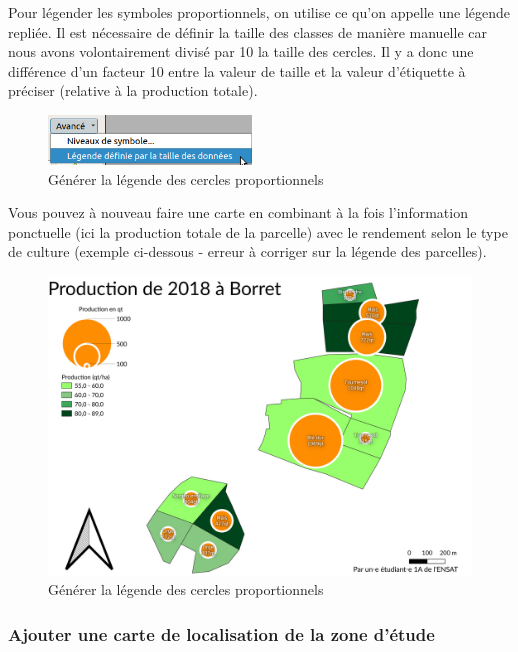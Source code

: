 Pour légender les symboles proportionnels, on utilise ce qu'on appelle
une légende repliée. Il est nécessaire de définir la taille des classes
de manière manuelle car nous avons volontairement divisé par 10 la
taille des cercles. Il y a donc une différence d'un facteur 10 entre la
valeur de taille et la valeur d'étiquette à préciser (relative à la
production totale).

\begin{figure}[htbp]
\centering
\includegraphics[height=0.52083in]{figures/legend_cercle.png}
\caption{Générer la légende des cercles proportionnels}
\end{figure}

Vous pouvez à nouveau faire une carte en combinant à la fois
l'information ponctuelle (ici la production totale de la parcelle) avec
le rendement selon le type de culture (exemple ci-dessous - erreur à
corriger sur la légende des parcelles).

\begin{figure}[htbp]
\centering
\includegraphics{figures/exemple_proportionnel.png}
\caption{Générer la légende des cercles proportionnels}
\end{figure}

\subsubsection{Ajouter une carte de localisation de la zone
d'étude}\label{ajouter-une-carte-de-localisation-de-la-zone-duxe9tude}

